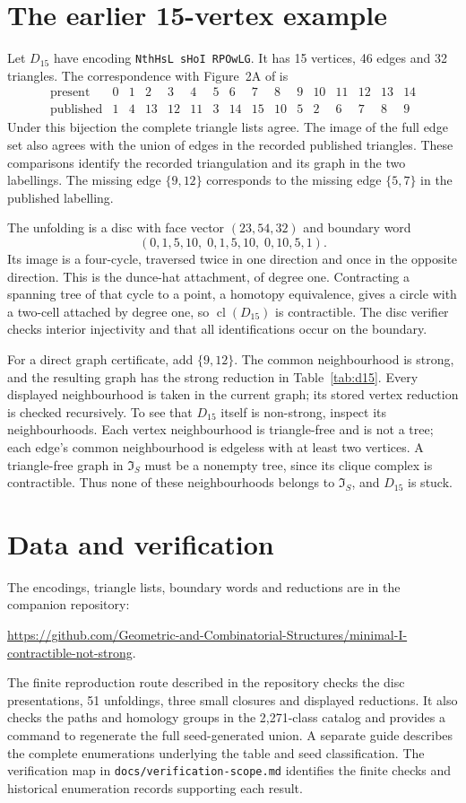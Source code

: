 \documentclass[11pt]{amsart}
\newcommand{\IS}{\mathfrak I_S}
\newcommand{\cl}{\operatorname{cl}}
\newcommand{\Dunce}{D_{15}}
\theoremstyle{definition}
\begin{document}
\section{The earlier 15-vertex example}
Let $\Dunce$ have encoding
\texttt{N\textbar thHsL sHoI RPOwLG}.
It has 15 vertices, 46 edges and 32 triangles.
The correspondence with Figure~2A of \cite{DEFH2023} is
\[
\begin{array}{c|rrrrrrrrrrrrrrr}
 \text{present}&0&1&2&3&4&5&6&7&8&9&10&11&12&13&14\\
 \text{published}&1&4&13&12&11&3&14&15&10&5&2&6&7&8&9
\end{array}
\]
Under this bijection the complete triangle lists agree. The image of
the full edge set also agrees with the union of edges in the recorded
published triangles. These comparisons identify the recorded
triangulation and its graph in the two labellings.
The missing edge $\{9,12\}$ corresponds to the missing edge
$\{5,7\}$ in the published labelling.

The unfolding is a disc with face vector $(23,54,32)$ and boundary word
\[
 (0,1,5,10,\;0,1,5,10,\;0,10,5,1).
\]
Its image is a four-cycle, traversed twice in one direction and once
in the opposite direction. This is the dunce-hat attachment, of degree one.
Contracting a spanning tree of that cycle to a point, a homotopy
equivalence, gives a circle with a two-cell attached by degree one, so $\cl(\Dunce)$ is contractible.
The disc verifier checks interior injectivity and that all
identifications occur on the boundary.

For a direct graph certificate, add $\{9,12\}$.
The common neighbourhood is strong, and the resulting graph has
the strong reduction in Table~\ref{tab:d15}.
Every displayed neighbourhood is taken in the current graph;
its stored vertex reduction is checked recursively.
To see that $\Dunce$ itself is non-strong, inspect its neighbourhoods.
Each vertex neighbourhood is triangle-free and is not a tree;
each edge's common neighbourhood is edgeless with at least two vertices.
A triangle-free graph in $\IS$ must be a nonempty tree, since its
clique complex is contractible. Thus none of these neighbourhoods
belongs to $\IS$, and $\Dunce$ is stuck.

\section{Data and verification}
The encodings, triangle lists, boundary words and reductions are
in the companion repository:
\begin{center}\small
\url{https://github.com/Geometric-and-Combinatorial-Structures/minimal-I-contractible-not-strong}.
\end{center}
The finite reproduction route described in the repository checks
the disc presentations,
51 unfoldings, three small closures and displayed reductions. It also
checks the paths and homology groups in the 2,271-class catalog and
provides a command to regenerate the full seed-generated union.
A separate guide describes the complete enumerations underlying the
table and seed classification. The verification map in
\texttt{docs/verification-scope.md} identifies the finite checks and
historical enumeration records supporting each result.
\end{document}
